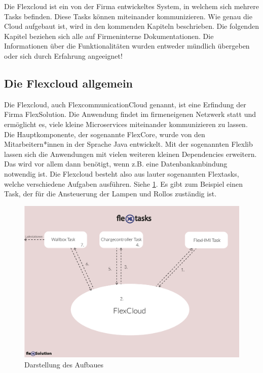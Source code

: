 Die Flexcloud ist ein von der Firma entwickeltes System, in welchem sich mehrere Tasks befinden. Diese Tasks können miteinander kommunizieren. Wie genau die Cloud aufgebaut ist, wird in den kommenden Kapiteln beschrieben.
Die folgenden Kapitel beziehen sich alle auf Firmeninterne Dokumentationen. Die Informationen über die Funktionalitäten wurden entweder mündlich übergeben oder sich durch Erfahrung angeeignet!


\subsection{Die Flexcloud allgemein} 



Die Flexcloud, auch FlexcommunicationCloud genannt, ist eine Erfindung der Firma FlexSolution. Die Anwendung findet im firmeneigenen Netzwerk statt und ermöglicht es, viele kleine Microservices miteinander kommunizieren zu lassen. Die Hauptkomponente, der sogenannte FlexCore, wurde von den Mitarbeitern*innen in der Sprache Java entwickelt. Mit der sogenannten Flexlib lassen sich die Anwendungen mit vielen weiteren kleinen Dependencies erweitern. Das wird vor allem dann benötigt, wenn z.B. eine Datenbankanbindung notwendig ist. Die Flexcloud besteht also aus lauter sogenannten Flextasks, welche verschiedene Aufgaben ausführen. Siehe \ref{fig:impl:FlexcloudAnsicht}. Es gibt zum Beispiel einen Task, der für die Ansteuerung der Lampen und Rollos zuständig ist.

\begin{figure}[h t]
    \centering
    \includegraphics[scale=0.7]{pics/flexTasks2.png}
    \caption{Darstellung des Aufbaues}
    \label{fig:impl:FlexcloudAnsicht}
\end{figure}




